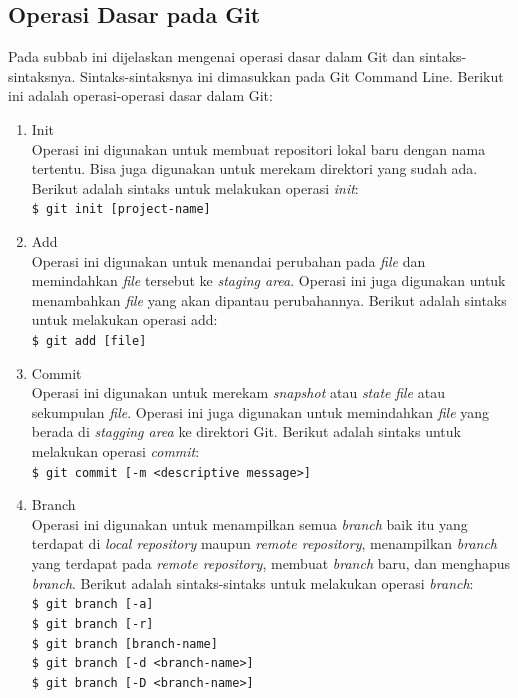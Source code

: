 \subsection{Operasi Dasar pada Git}
\label{subsec:operasi_dasar_git}
Pada subbab ini dijelaskan mengenai operasi dasar dalam Git dan sintaks-sintaksnya. Sintaks-sintaksnya ini dimasukkan pada Git Command Line. Berikut ini adalah operasi-operasi dasar dalam Git:
\begin{enumerate}
\item Init\\
Operasi ini digunakan untuk membuat repositori lokal baru dengan nama tertentu. Bisa juga digunakan untuk merekam direktori yang sudah ada. Berikut adalah sintaks untuk melakukan operasi  \textit{init}:\\
\texttt{\$ git init [project-name]}  
\item Add\\
Operasi ini digunakan untuk menandai perubahan pada \textit{file} dan memindahkan \textit{file} tersebut ke \textit{staging area}. Operasi ini juga digunakan untuk menambahkan \textit{file} yang akan dipantau perubahannya. Berikut adalah sintaks untuk melakukan operasi add:\\
\texttt{\$ git add [file]}  
\item Commit\\
Operasi ini digunakan untuk merekam \textit{snapshot} atau \textit{state} \textit{file} atau sekumpulan \textit{file}. Operasi ini juga digunakan untuk memindahkan \textit{file} yang berada di \textit{stagging area} ke direktori Git. Berikut adalah sintaks untuk melakukan operasi \textit{commit}:\\
\texttt{\$ git commit [-m <descriptive message>]}  
\item Branch\\
Operasi ini digunakan untuk menampilkan semua \textit{branch} baik itu yang terdapat di \textit{local repository} maupun \textit{remote repository}, menampilkan \textit{branch} yang terdapat pada \textit{remote repository}, membuat \textit{branch} baru, dan menghapus \textit{branch}. Berikut adalah sintaks-sintaks untuk melakukan operasi \textit{branch}:\\
\texttt{\$ git branch [-a]}\\ 
\texttt{\$ git branch [-r]}\\
\texttt{\$ git branch [branch-name]}\\
\texttt{\$ git branch [-d <branch-name>]}\\
\texttt{\$ git branch [-D <branch-name>]} 

\end{enumerate}

